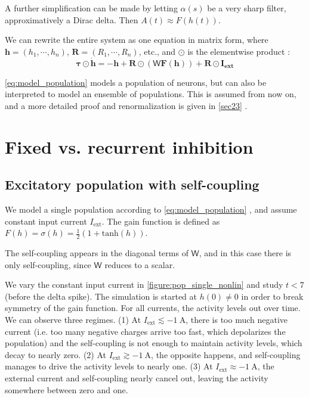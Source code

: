 \documentclass[10pt,conference,compsocconf,a4paper]{IEEEtran}
\renewcommand{\vec}[1]{\boldsymbol{#1}}
\newcommand{\nunit}[1]{\ \si{#1}}
\newcommand*{\shortautoref}[1]{%
	\begingroup
	\def\equationautorefname{\textsc{Eq.}}%
	\def\tableautorefname{\textsc{Tab.}}%
	\def\figureautorefname{\textsc{Fig.}}%
	\autoref{#1}%
	\endgroup
}
\begin{document}
	A further simplification can be made by letting $\alpha(s)$ be a very sharp filter, approximatively a Dirac delta. Then $A(t) \approx F(h(t))$.

	We can rewrite the entire system as one equation in matrix form, where $\vec h = (h_1, \cdots, h_n)$, $\vec R = (R_1, \cdots, R_n)$, etc., and $\odot$ is the elementwise product :
\
	\begin{equation} \label{eq:model_population}
		\vec{\tau} \odot \dot{\vec h} = -\vec h + \vec R \odot (\mathsf W \vec F(\vec h)) + \vec R \odot \vec{I_{\text{ext}}}
	\end{equation}

	\shortautoref{eq:model_population} models a population of neurons, but can also be interpreted to model an ensemble of populations. This is assumed from now on, and a more detailed proof and renormalization is given in \shortautoref{sec23}.

\section{Fixed vs. recurrent inhibition}
\label{sec1}

	\subsection{Excitatory population with self-coupling}
	\label{sec11}

		We model a single population according to \shortautoref{eq:model_population}, and assume constant input current $I_{\text{ext}}$. The gain function is defined as $F(h) = \sigma(h) = \frac 12 (1 + \mathrm{tanh}(h))$.
		
		The self-coupling appears in the diagonal terms of $\mathsf W$, and in this case there is only self-coupling, since $\mathsf W$ reduces to a scalar.

		We vary the constant input current in \shortautoref{figure:pop_single_nonlin} and study $t < 7$ (before the delta spike). The simulation is started at $h(0) \neq 0$ in order to break symmetry of the gain function. For all currents, the activity levels out over time. We can observe three regimes.
		(1) At $I_{\text{ext}} \lesssim -1 \nunit{\ampere}$, there is too much negative current (i.e. too many negative charges arrive too fast, which depolarizes the population) and the self-coupling is not enough to maintain activity levels, which decay to nearly zero.
		(2) At $I_{\text{ext}} \gtrsim -1 \nunit{\ampere}$, the opposite happens, and self-coupling manages to drive the activity levels to nearly one.
		(3) At $I_{\text{ext}} \approx -1 \nunit{\ampere}$, the external current and self-coupling nearly cancel out, leaving the activity somewhere between zero and one.
\end{document}
